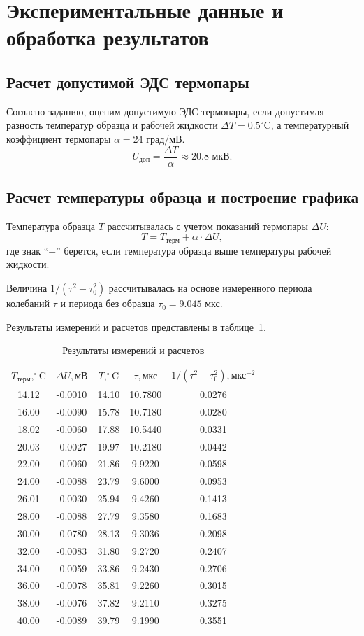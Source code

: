 \documentclass[a4paper,10pt]{article}
\begin{document}
\section{Экспериментальные данные и обработка результатов}

\subsection*{Расчет допустимой ЭДС термопары}
Согласно заданию, оценим допустимую ЭДС термопары, если допустимая разность температур образца и рабочей жидкости \(\Delta T = 0.5^\circ\text{C}\), а температурный коэффициент термопары \(\alpha = 24 \text{ град/мВ}\).
\[
U_{\text{доп}} = \frac{\Delta T}{\alpha}  \approx 20.8 \text{ мкВ}.
\]

\subsection*{Расчет температуры образца и построение графика}
Температура образца \(T\) рассчитывалась с учетом показаний термопары \(\Delta U\):
\[
T = T_{\text{терм}} + \alpha \cdot \Delta U,
\]
где знак ``\(+\)'' берется, если температура образца выше температуры рабочей жидкости.

Величина \(1/(\tau^2 - \tau_0^2)\) рассчитывалась на основе измеренного периода колебаний \(\tau\) и периода без образца \(\tau_0 = 9.045 \text{ мкс}\).

Результаты измерений и расчетов представлены в таблице~\ref{tab:data}.

\begin{table}[H]
\centering
\caption{Результаты измерений и расчетов}
\label{tab:data}
\begin{tabular}{|c|c|c|c|c|}
\hline
\(T_{\text{терм}}, ^\circ\text{C}\) & \(\Delta U, \text{мВ}\) & \(T, ^\circ\text{C}\) & \(\tau, \text{мкс}\) & \(1/(\tau^2-\tau_0^2), \text{мкс}^{-2}\) \\
\hline
14.12 & -0.0010 & 14.10 & 10.7800 & 0.0276 \\
16.00 & -0.0090 & 15.78 & 10.7180 & 0.0280 \\
18.02 & -0.0060 & 17.88 & 10.5440 & 0.0331 \\
20.03 & -0.0027 & 19.97 & 10.2180 & 0.0442 \\
22.00 & -0.0060 & 21.86 & 9.9220 & 0.0598 \\
24.00 & -0.0088 & 23.79 & 9.6000 & 0.0953 \\
26.01 & -0.0030 & 25.94 & 9.4260 & 0.1413 \\
28.00 & -0.0088 & 27.79 & 9.3580 & 0.1683 \\
30.00 & -0.0780 & 28.13 & 9.3036 & 0.2098 \\
32.00 & -0.0083 & 31.80 & 9.2720 & 0.2407 \\
34.00 & -0.0059 & 33.86 & 9.2430 & 0.2706 \\
36.00 & -0.0078 & 35.81 & 9.2260 & 0.3015 \\
38.00 & -0.0076 & 37.82 & 9.2110 & 0.3275 \\
40.00 & -0.0089 & 39.79 & 9.1990 & 0.3551 \\
\hline
\end{tabular}
\end{table}
\end{document}
